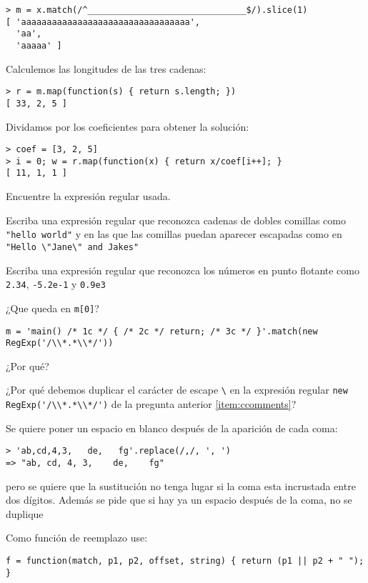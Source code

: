 \begin{verbatim}
> m = x.match(/^_______________________________$/).slice(1)
[ 'aaaaaaaaaaaaaaaaaaaaaaaaaaaaaaaaa',
  'aa',
  'aaaaa' ]
\end{verbatim}
Calculemos las longitudes de las tres cadenas:
\begin{verbatim}
> r = m.map(function(s) { return s.length; })
[ 33, 2, 5 ]
\end{verbatim}
Dividamos por los coeficientes para obtener la solución:
\begin{verbatim}
> coef = [3, 2, 5]
> i = 0; w = r.map(function(x) { return x/coef[i++]; }
[ 11, 1, 1 ]
\end{verbatim}
Encuentre la expresión regular usada.
\item 
Escriba una expresión regular que reconozca cadenas de dobles comillas como \verb|"hello world"|
y en las que las comillas puedan aparecer escapadas como en \verb|"Hello \"Jane\" and Jakes"|

\item
Escriba una expresión regular que reconozca los números en punto flotante como
\verb|2.34|, \verb|-5.2e-1| y \verb|0.9e3|

\item
\label{item:ccomments}
¿Que queda en \verb|m[0]|?
\begin{verbatim}
m = 'main() /* 1c */ { /* 2c */ return; /* 3c */ }'.match(new RegExp('/\\*.*\\*/'))
\end{verbatim}
¿Por qué?
\item 
¿Por qué debemos duplicar el carácter de escape \verb|\| en  la expresión regular \verb|new RegExp('/\\*.*\\*/')| de la pregunta anterior \ref{item:ccomments}?
\item
Se quiere poner un espacio en blanco después de la aparición de cada coma:
\begin{verbatim}
> 'ab,cd,4,3,   de,   fg'.replace(/,/, ', ')
=> "ab, cd, 4, 3,    de,    fg" 
\end{verbatim}
pero se quiere que la sustitución no tenga lugar si la coma esta incrustada entre
dos dígitos. Además se pide que si hay ya un espacio después de la coma,
no se duplique

Como función de reemplazo use:
\begin{verbatim}
f = function(match, p1, p2, offset, string) { return (p1 || p2 + " "); }
\end{verbatim}

